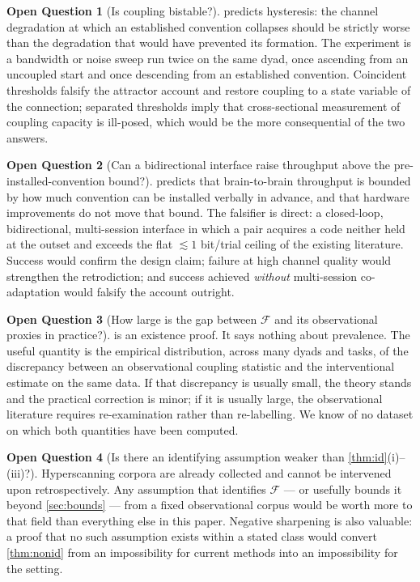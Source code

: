 \documentclass[11pt,a4paper]{article}
\theoremstyle{plain}
\theoremstyle{definition}
\newtheorem{question}{Open Question}
\theoremstyle{remark}
\newcommand{\Fc}{\mathcal{F}}
\begin{document}
\begin{question}[Is coupling bistable?]\label{q:hysteresis}
 predicts hysteresis: the channel degradation at which an established convention collapses should
be strictly worse than the degradation that would have prevented its formation. The experiment is a bandwidth or
noise sweep run twice on the same dyad, once ascending from an uncoupled start and once descending from an
established convention. Coincident thresholds falsify the attractor account and restore coupling to a state
variable of the connection; separated thresholds imply that cross-sectional measurement of coupling capacity is
ill-posed, which would be the more consequential of the two answers.
\end{question}

\begin{question}[Can a bidirectional interface raise throughput above the pre-installed-convention
bound?]\label{q:bbi}
 predicts that brain-to-brain throughput is bounded by how much convention can be installed
verbally in advance, and that hardware improvements do not move that bound. The falsifier is direct: a
closed-loop, bidirectional, multi-session interface in which a pair acquires a code neither held at the outset
and exceeds the flat $\lesssim 1$ bit/trial ceiling of the existing literature. Success would confirm the design
claim; failure at high channel quality would strengthen the retrodiction; and success achieved \emph{without}
multi-session co-adaptation would falsify the account outright.
\end{question}

\begin{question}[How large is the gap between $\Fc$ and its observational proxies in practice?]\label{q:size}
 is an existence proof. It says nothing about prevalence. The useful quantity is the empirical
distribution, across many dyads and tasks, of the discrepancy between an observational coupling statistic and the
interventional estimate on the same data. If that discrepancy is usually small, the theory stands and the
practical correction is minor; if it is usually large, the observational literature requires re-examination
rather than re-labelling. We know of no dataset on which both quantities have been computed.
\end{question}

\begin{question}[Is there an identifying assumption weaker than \cref{thm:id}(i)--(iii)?]\label{q:weaker}
Hyperscanning corpora are already collected and cannot be intervened upon retrospectively. Any assumption that
identifies $\Fc$ --- or usefully bounds it beyond \cref{sec:bounds} --- from a fixed observational corpus would be
worth more to that field than everything else in this paper. Negative sharpening is also valuable: a proof that
no such assumption exists within a stated class would convert \cref{thm:nonid} from an impossibility for current
methods into an impossibility for the setting.
\end{question}
\end{document}
